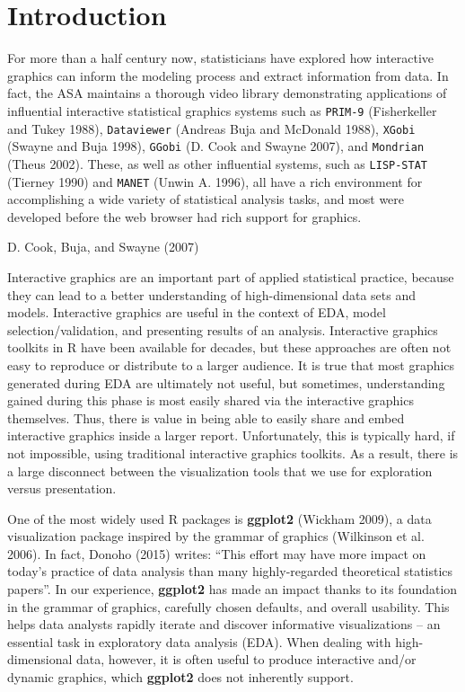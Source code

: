 \documentclass[12pt,]{article}
\theoremstyle{definition}
\theoremstyle{definition}
\theoremstyle{definition}
\theoremstyle{remark}
\begin{document}

\hypertarget{intro}{%
\section{Introduction}\label{intro}}

For more than a half century now, statisticians have explored how
interactive graphics can inform the modeling process and extract
information from data. In fact, the ASA maintains a thorough video
library demonstrating applications of influential interactive
statistical graphics systems such as \texttt{PRIM-9} (Fisherkeller and
Tukey 1988), \texttt{Dataviewer} (Andreas Buja and McDonald 1988),
\texttt{XGobi} (Swayne and Buja 1998), \texttt{GGobi} (D. Cook and
Swayne 2007), and \texttt{Mondrian} (Theus 2002). These, as well as
other influential systems, such as \texttt{LISP-STAT} (Tierney 1990) and
\texttt{MANET} (Unwin A. 1996), all have a rich environment for
accomplishing a wide variety of statistical analysis tasks, and most
were developed before the web browser had rich support for graphics.

D. Cook, Buja, and Swayne (2007)

Interactive graphics are an important part of applied statistical
practice, because they can lead to a better understanding of
high-dimensional data sets and models. Interactive graphics are useful
in the context of EDA, model selection/validation, and presenting
results of an analysis. Interactive graphics toolkits in R have been
available for decades, but these approaches are often not easy to
reproduce or distribute to a larger audience. It is true that most
graphics generated during EDA are ultimately not useful, but sometimes,
understanding gained during this phase is most easily shared via the
interactive graphics themselves. Thus, there is value in being able to
easily share and embed interactive graphics inside a larger report.
Unfortunately, this is typically hard, if not impossible, using
traditional interactive graphics toolkits. As a result, there is a large
disconnect between the visualization tools that we use for exploration
versus presentation.

One of the most widely used R packages is \textbf{ggplot2} (Wickham
2009), a data visualization package inspired by the grammar of graphics
(Wilkinson et al. 2006). In fact, Donoho (2015) writes: ``This effort
may have more impact on today's practice of data analysis than many
highly-regarded theoretical statistics papers''. In our experience,
\textbf{ggplot2} has made an impact thanks to its foundation in the
grammar of graphics, carefully chosen defaults, and overall usability.
This helps data analysts rapidly iterate and discover informative
visualizations -- an essential task in exploratory data analysis (EDA).
When dealing with high-dimensional data, however, it is often useful to
produce interactive and/or dynamic graphics, which \textbf{ggplot2} does
not inherently support.
\end{document}
